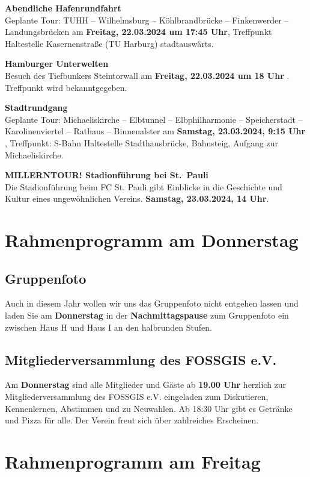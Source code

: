 \noindent
{\large \bfseries Abendliche Hafenrundfahrt}\\
Geplante Tour: TUHH – Wilhelmsburg – Köhlbrandbrücke – Finkenwerder – Landungsbrücken am {\bfseries Freitag, 22.03.2024 um 17:45 Uhr}, Treffpunkt Haltestelle Kasernenstraße (TU Harburg) stadtauswärts.
\bigskip

\noindent
{\large \bfseries Hamburger Unterwelten}\\
Besuch des Tiefbunkers Steintorwall am {\bfseries Freitag, 22.03.2024 um 18 Uhr }. Treffpunkt wird bekanntgegeben.
\bigskip

\noindent
{\large \bfseries Stadtrundgang}\\
Geplante Tour: Michaeliskirche – Elbtunnel – Elbphilharmonie – Speicherstadt – Karolinenviertel – Rathaus – Binnenalster am {\bfseries Samstag, 23.03.2024, 9:15 Uhr }, Treffpunkt: S-Bahn Haltestelle Stadthausbrücke, Bahnsteig, Aufgang zur Michaeliskirche.
\bigskip

\noindent
{\large \bfseries MILLERNTOUR! Stadionführung bei St.~Pauli}\\
Die Stadionführung beim FC St. Pauli gibt Einblicke in die Geschichte und Kultur eines ungewöhnlichen Vereins. {\bfseries Samstag, 23.03.2024, 14 Uhr}.

\section*{Rahmenprogramm am Donnerstag}
\subsection*{Gruppenfoto}
Auch in diesem Jahr wollen wir uns das Gruppenfoto nicht entgehen lassen und laden Sie am {\bfseries Donnerstag} in der {\bfseries Nachmittagspause} zum Gruppenfoto ein zwischen Haus H und Haus I an den halbrunden Stufen.

\subsection*{Mitgliederversammlung des FOSSGIS e.V.}
Am {\bfseries Donnerstag} sind alle Mitglieder und Gäste ab {\bfseries 19.00 Uhr} herzlich zur Mitgliederversammlung des FOSSGIS e.V. eingeladen zum Diskutieren, Kennenlernen, Abstimmen und zu Neuwahlen. Ab 18:30 Uhr
gibt es Getränke und Pizza für alle. Der Verein freut sich über zahlreiches Erscheinen.

\section*{Rahmenprogramm am Freitag}
